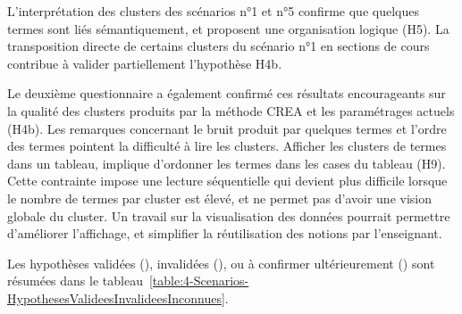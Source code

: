 L'interprétation des clusters des scénarios n°1 et n°5 confirme que quelques termes sont liés sémantiquement, et proposent une organisation logique (H5).
La transposition directe de certains clusters du scénario n°1 en sections de cours contribue à valider partiellement l'hypothèse H4b.

Le deuxième questionnaire a également confirmé ces résultats encourageants sur la qualité des clusters produits par la méthode CREA et les paramétrages actuels (H4b).
Les remarques concernant le bruit produit par quelques termes et l'ordre des termes pointent la difficulté à lire les clusters.
Afficher les clusters de termes dans un tableau, implique d'ordonner les termes dans les cases du tableau (H9).
Cette contrainte impose une lecture séquentielle qui devient plus difficile lorsque le nombre de termes par cluster est élevé, et ne permet pas d'avoir une vision globale du cluster.
Un travail sur la visualisation des données pourrait permettre d'améliorer l'affichage, et simplifier la réutilisation des notions par l'enseignant.

\bigskip



Les hypothèses validées (\checkmark), invalidées (), ou à confirmer ultérieurement () sont résumées dans le tableau~\ref{table:4-Scenarios-HypothesesValideesInvalideesInconnues}.




